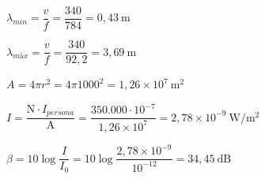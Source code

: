\begin{solapartat}
 $\lambda_{min} = \dfrac{v}{f} = \dfrac{340}{784} = 0,43\ \mathrm{m}$

 $\lambda_{\textit{màx}} = \dfrac{v}{f} = \dfrac{340}{92,2} = 3,69\ \mathrm{m}$
\end{solapartat}

\begin{solapartat}
 $A = 4\pi r^2 = 4\pi 1000^2 = 1,26\times 10^{7}\ \mathrm{m^2}$

 $I = \dfrac{\mathrm{N}\cdot I_{persona}}{\mathrm{A}} = \dfrac{350.000\cdot 10^{-7}}{1,26\times 10^{7}} = 2,78\times 10^{-9}\ \mathrm{W/m^2}$

 $\beta = 10\log\dfrac{I}{I_0} = 10\log\dfrac{2,78\times 10^{-9}}{10^{-12}} = 34,45\ \mathrm{dB}$
\end{solapartat}
